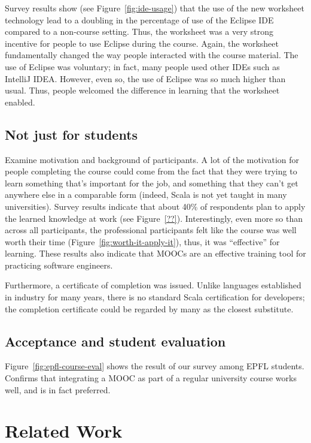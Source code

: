 \documentclass{sig-alternate}
\begin{document}
Survey results show (see Figure~\ref{fig:ide-usage}) that the use
of the new worksheet technology lead to a doubling in the percentage of use of
the Eclipse IDE compared to a non-course setting. Thus, the worksheet was a
very strong incentive for people to use Eclipse during the course. Again, the
worksheet fundamentally changed the way people interacted with the course
material. The use of Eclipse was voluntary; in fact, many people used other
IDEs such as IntelliJ IDEA. However, even so, the use of Eclipse was so much
higher than usual. Thus, people welcomed the difference in learning that the
worksheet enabled.


\subsection{Not just for students}

Examine motivation and background of participants. A lot of the motivation for
people completing the course could come from the fact that they were trying to
learn something that's important for the job, and something that they can't
get anywhere else in a comparable form (indeed, Scala is not yet taught in
many universities). Survey results indicate that about 40\% of respondents
plan to apply the learned knowledge at work (see Figure~\ref{??}).
Interestingly, even more so than across all participants, the professional
participants felt like the course was well worth their time
(Figure~\ref{fig:worth-it-apply-it}), thus, it was ``effective'' for learning.
These results also indicate that MOOCs are an effective training tool for practicing
software engineers.

Furthermore, a certificate of completion was issued. Unlike languages
established in industry for many years, there is no standard Scala
certification for developers; the completion certificate could be regarded by
many as the closest substitute.


\subsection{Acceptance and student evaluation}

Figure~\ref{fig:epfl-course-eval} shows the result of our survey among EPFL
students. Confirms that integrating a MOOC as part of a regular university
course works well, and is in fact preferred.



\section{Related Work}
\label{sec:related-work}
\end{document}

